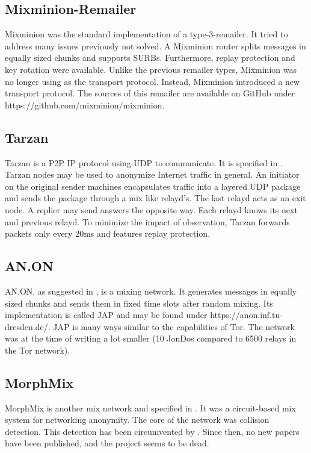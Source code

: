 \subsection{Mixminion-Remailer\label{sec:remMixminion}}
Mixminion was the standard implementation of a type-3-remailer. It tried to address many issues previously not solved. A Mixminion router splits messages in equally sized chunks and supports SURBs. Furthermore,  replay protection and key rotation were available. Unlike the previous remailer types, Mixminion was no longer using  as the transport protocol. Instead, Mixminion introduced a new transport protocol. The sources of this remailer are available on GitHub under https://github.com/mixminion/mixminion.

\subsection{Tarzan}
Tarzan is a P2P IP protocol using UDP to communicate. It is specified in \cite{tarzan:ccs02}. Tarzan nodes may be used to anonymize Internet traffic in general. An initiator on the original sender machines encapsulates traffic into a layered UDP package and sends the package through a mix like relayd's. The last relayd acts as an exit node. A replier may send answers the opposite way. Each relayd knows its next and previous relayd. To minimize the impact of observation, Tarzan forwards packets only every 20ms and features replay protection.

\subsection{AN.ON}
AN.ON, as suggested in \cite{federrath2003system}, is a mixing network. It generates messages in equally sized chunks and sends them in fixed time slots after random mixing. Its implementation is called JAP and may be found under https://anon.inf.tu-dresden.de/. JAP is many ways similar to the capabilities of Tor. The network was at the time of writing a lot smaller (10 JonDos compared to 6500 relays in the Tor network).

\subsection{MorphMix}
MorphMix is another mix network and specified in \cite{morphmix:wpes2002}. It was a circuit-based mix system for networking anonymity. The core of the network was collision detection. This detection has been circumvented by \cite{morphmix:pet2006}. Since then, no new papers have been published, and the project seems to be dead.

